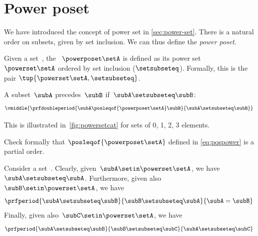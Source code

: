 
\section{Power poset}
\label{sec:power-poset}


We have introduced the concept of power set in \cref{sec:power-set}.
There is a natural order on subsets, given by set inclusion.
We can thus define the \emph{power poset}.

\begin{definition}
    \label{def:power-poset}
    Given a set~\setA, the ~$\powerposet\setA$ is defined as its power set $\powerset\setA$ ordered by set inclusion ($\setsubseteq$).
    Formally, this is the pair $\tup{\powerset\setA, \setsubseteq}$.

    A subset~$\subA$ precedes~$\subB$ if~$\subA \setsubseteq \subB$:
    \begin{equation} \label{eq:pospower}
        \vmiddle{
            \prfdoubleperiod{
                \subA \posleqof{\powerposet\setA} \subB
            }{
                \subA \setsubseteq \subB
            }
        }
    \end{equation}
\end{definition}
This is illustrated in~\cref{fig:powersetcat} for sets of 0, 1, 2, 3 elements.
\begin{exercise}
    Check formally that $\posleqof{\powerposet\setA}$ defined in \cref{eq:pospower} is a partial order.
\end{exercise}
\begin{solution}
    Consider a set~\setA.
    Clearly, given~$\subA\setin \powerset \setA$, we have~$\subA\setsubseteq \subA$.
    Furthermore, given also~$\subB\setin \powerset \setA$, we have
    \begin{equation}\label{eq:ex-pospower-1}
        \prfperiod{
            \subA\setsubseteq \subB
        }{
            \subB\setsubseteq \subA
        }{
            \subA=\subB
        }
    \end{equation}
    Finally, given also~$\subC\setin \powerset \setA$, we have
    \begin{equation}\label{eq:ex-pospower-2}
        \prfperiod{
            \subA\setsubseteq \subB
        }{
            \subB\setsubseteq \subC
        }{
            \subA\setsubseteq\subC
        }
    \end{equation}
\end{solution}
